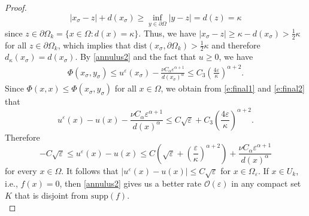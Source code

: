 \documentclass[11pt,reqno]{amsart}
\numberwithin{figure}{section}
\theoremstyle{plain}
\theoremstyle{remark}
\numberwithin{equation}{section}
\begin{document}
\begin{proof}
\begin{equation*}
    |x_\sigma - z| + d(x_\sigma) \geq \inf_{y\in \partial \Omega}|y-z| = d(z) = \kappa
\end{equation*}
since $z\in \partial\Omega_k = \{x \in \Omega: d(x) = \kappa\}$. Thus, we have $|x_\sigma - z| \geq \kappa - d(x_\sigma) > \frac{1}{2}\kappa$ for all $z\in \partial\Omega_k$, which implies that $\mathrm{dist}(x_\sigma,\partial\Omega_k)>\frac{1}{2}\kappa$ and therefore $d_\kappa(x_\sigma) = d(x_\sigma)$. By \eqref{annulus2} and the fact that $u \geq 0$, we have
\begin{align}
    \Phi(x_\sigma, y_\sigma)\leq u^\varepsilon(x_\sigma) - \frac{\nu C_\alpha \varepsilon^{\alpha+1}}{d(x_\sigma)^\alpha} \leq C_3\left(\frac{4\varepsilon}{\kappa}\right)^{\alpha+2} \label{e:final2}.
\end{align}
\noindent
Since $\Phi(x,x) \leq \Phi(x_\sigma,y_\sigma)$ for all $x\in \Omega$, we obtain from \eqref{e:final1} and \eqref{e:final2} that
\begin{equation*}
    u^\varepsilon(x)-u(x)-\frac{\nu C_\alpha  \varepsilon^{\alpha+1}}{d(x)^\alpha} \leq C\sqrt{\varepsilon} +C_3\left(\frac{4\varepsilon}{\kappa}\right)^{\alpha+2}.
\end{equation*}
Therefore
\begin{equation*}
   -C \sqrt{\varepsilon}\leq  u^\varepsilon(x) - u(x) \leq C\left(\sqrt{\varepsilon}+\left(\frac{\varepsilon}{\kappa}\right)^{\alpha+2}\right) + \frac{\nu C_\alpha  \varepsilon^{\alpha+1}}{d(x)^\alpha} 
\end{equation*}
for every $x\in \Omega$. It follows that $|u^\varepsilon(x)-u(x)| \leq C\sqrt{\varepsilon}$ for $x\in \Omega_\varepsilon$. 
If $x\in U_k$, i.e., $f(x) = 0$, then \eqref{annulus2} gives us a better rate $\mathcal{O}(\varepsilon)$ in any compact set $K$ that is disjoint from $\mathrm{supp}(f)$. \\


\end{proof}
\end{document}
